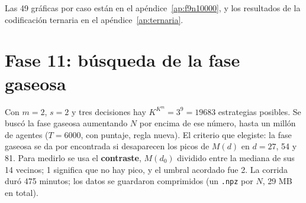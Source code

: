 \documentclass[11pt,letterpaper]{article}
\begin{document}
Las 49 gráficas por caso están en el apéndice~\ref{ap:f9n10000}, y los resultados de la codificación ternaria en el apéndice~\ref{ap:ternaria}.

\section{Fase 11: búsqueda de la fase gaseosa}
Con $m=2$, $s=2$ y tres decisiones hay $K^{K^m}=3^9=19683$ estrategias posibles. Se buscó la fase gaseosa aumentando $N$ por encima de ese número, hasta un millón de agentes ($T=6000$, con puntaje, regla nueva). El criterio que elegiste: la fase gaseosa se da por encontrada si desaparecen los picos de $M(d)$ en $d=27$, 54 y 81. Para medirlo se usa el \textbf{contraste}, $M(d_0)$ dividido entre la mediana de sus 14 vecinos; 1 significa que no hay pico, y el umbral acordado fue 2. La corrida duró 475 minutos; los datos se guardaron comprimidos (un \texttt{.npz} por $N$, 29 MB en total).
\end{document}
